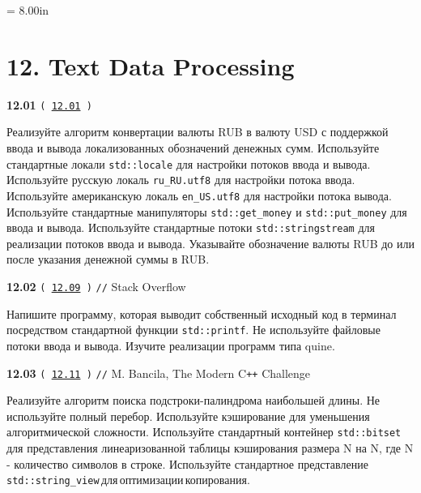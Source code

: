 \documentclass[a4paper,12pt]{article}
\begin{document}
\newpage\thispagestyle{empty}\pdfpageheight = 8.00in\enlargethispage{100in}

\section{12. Text Data Processing}

{\large \textbf{12.01} \texttt{(\,\href{https://github.com/i-s-m-mipt/Education/blob/master/projects/examples/source/12.01.cpp}{12.01}\,)}}

\bigskip

Реализуйте алгоритм конвертации валюты RUB в валюту USD с поддержкой ввода и вывода локализованных обозначений денежных сумм. Используйте стандартные локали \lstinline{std::locale} для настройки потоков ввода и вывода. Используйте русскую локаль \lstinline{ru_RU.utf8} для настройки потока ввода. Используйте американскую локаль \lstinline{en_US.utf8} для настройки потока вывода. Используйте стандартные манипуляторы \lstinline{std::get_money} и \lstinline{std::put_money} для ввода и вывода. Используйте стандартные потоки \lstinline{std::stringstream} для реализации потоков ввода и вывода. Указывайте обозначение валюты RUB до или после указания денежной суммы в RUB.

\bigskip

{\large \textbf{12.02} \texttt{(\,\href{https://github.com/i-s-m-mipt/Education/blob/master/projects/examples/source/12.09.cpp}{12.09}\,)} \texttt{//} Stack Overflow}

\bigskip

Напишите программу, которая выводит собственный исходный код в терминал посредством стандартной функции \lstinline{std::printf}. Не используйте файловые потоки ввода и вывода. Изучите реализации программ типа quine.

\bigskip

{\large \textbf{12.03} \texttt{(\,\href{https://github.com/i-s-m-mipt/Education/blob/master/projects/examples/source/12.11.cpp}{12.11}\,)} \texttt{//} M. Bancila, The Modern C\texttt{++} Challenge}

\bigskip

Реализуйте алгоритм поиска подстроки-палиндрома наибольшей длины. Не используйте полный перебор. Используйте кэширование для уменьшения алгоритмической сложности. Используйте стандартный контейнер \lstinline{std::bitset} для представления линеаризованной таблицы кэширования размера N на N, где N - количество символов в строке. Используйте стандартное представление \lstinline{std::string_view}\,для\,оптимизации\,копирования.
\end{document}
